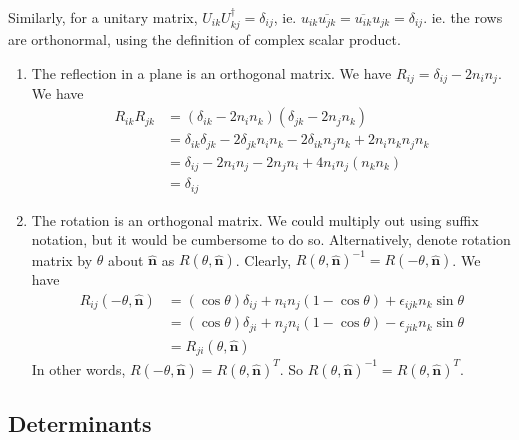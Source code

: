 \documentclass[a4paper]{article}
\begin{document}
Similarly, for a unitary matrix, $U_{ik}U_{kj}^\dagger = \delta_{ij}$, ie. $u_{ik}\overline{u_{jk}} = \overline{u_{ik}}u_{jk} =\delta_{ij}$. ie. the rows are orthonormal, using the definition of complex scalar product.

\begin{eg}\leavevmode
  \begin{enumerate}
    \item The reflection in a plane is an orthogonal matrix. We have $R_{ij} = \delta_{ij} - 2n_in_j$. We have
      \begin{align*}
        R_{ik}R_{jk} &= (\delta_{ik} - 2n_in_k)(\delta_{jk} - 2n_jn_k)\\
        &= \delta_{ik}\delta_{jk} - 2\delta_{jk}n_in_k - 2\delta_{ik}n_jn_k + 2n_in_kn_jn_k\\
        &= \delta_{ij} - 2n_in_j - 2n_jn_i + 4n_in_j(n_kn_k)\\
        &= \delta_{ij}
      \end{align*}
    \item The rotation is an orthogonal matrix. We could multiply out using suffix notation, but it would be cumbersome to do so. Alternatively, denote rotation matrix by $\theta$ about $\mathbf{\hat n}$ as $R(\theta, \mathbf{\hat n})$. Clearly, $R(\theta, \mathbf{\hat n})^{-1} = R(-\theta, \mathbf{\hat n})$. We have
      \begin{align*}
        R_{ij}(-\theta, \mathbf{\hat n}) &= (\cos\theta)\delta_{ij} + n_in_j(1 - \cos\theta) + \epsilon_{ijk}n_k\sin\theta\\
        &= (\cos\theta)\delta_{ji} + n_jn_i(1 - \cos\theta) - \epsilon_{jik}n_k\sin\theta\\
        &= R_{ji}(\theta, \mathbf{\hat n})
      \end{align*}
      In other words, $R(-\theta, \mathbf{\hat n}) = R(\theta, \mathbf{\hat n})^T$. So $R(\theta, \mathbf{\hat n})^{-1} = R(\theta, \mathbf{\hat n})^T$.
  \end{enumerate}
\end{eg}

\subsection{Determinants}
\end{document}
